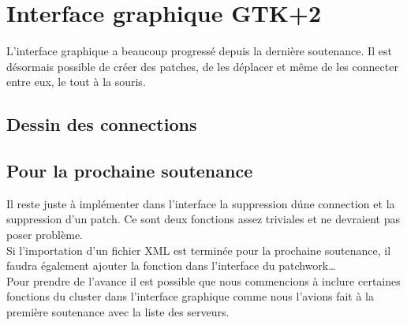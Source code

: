 \chapter{Interface graphique GTK+2}

L'interface graphique a beaucoup progress\'e depuis la derni\`ere soutenance.
Il est d\'esormais possible de cr\'eer des patches, de les d\'eplacer
et m\^eme de les connecter entre eux, le tout \`a la souris.\\



\section{Dessin des connections}





\section{Pour la prochaine soutenance}

Il reste juste \`a impl\'ementer dans l'interface la suppression
d\'une connection et la suppression d'un patch. Ce sont deux
fonctions assez triviales et ne devraient pas poser probl\`eme.\\

Si l'importation d'un fichier XML est termin\'ee pour la prochaine
soutenance, il faudra \'egalement ajouter la fonction dans l'interface
du patchwork\ldots\\

Pour prendre de l'avance il est possible que nous commencions \`a
inclure certaines fonctions du cluster dans l'interface graphique
comme nous l'avions fait \`a la premi\`ere soutenance avec la liste
des serveurs.\\
